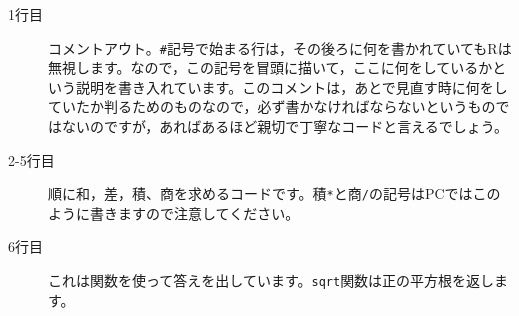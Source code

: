 \begin{description}
	\item[1行目] コメントアウト。\verb|#|記号で始まる行は，その後ろに何を書かれていてもRは無視します。なので，この記号を冒頭に描いて，ここに何をしているかという説明を書き入れています。このコメントは，あとで見直す時に何をしていたか判るためのものなので，必ず書かなければならないというものではないのですが，あればあるほど親切で丁寧なコードと言えるでしょう。
	\item[2-5行目] 順に和，差，積、商を求めるコードです。積\verb|*|と商\verb|/|の記号はPCではこのように書きますので注意してください。
	\item[6行目] これは関数を使って答えを出しています。\texttt{sqrt}関数は正の平方根を返します。
\end{description}
